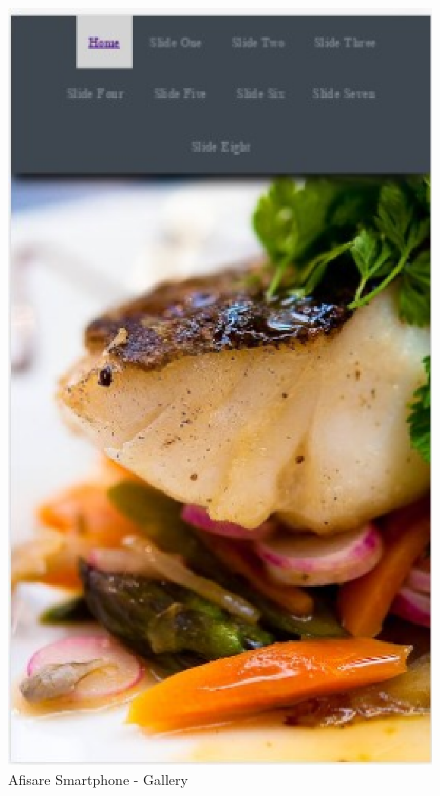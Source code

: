 \documentclass[11pt]{article}
\begin{document}
\begin{figure}[h]
\includegraphics{images/10.eps}
\caption{Afisare Smartphone - Gallery}
\end{figure}
\end{document}
